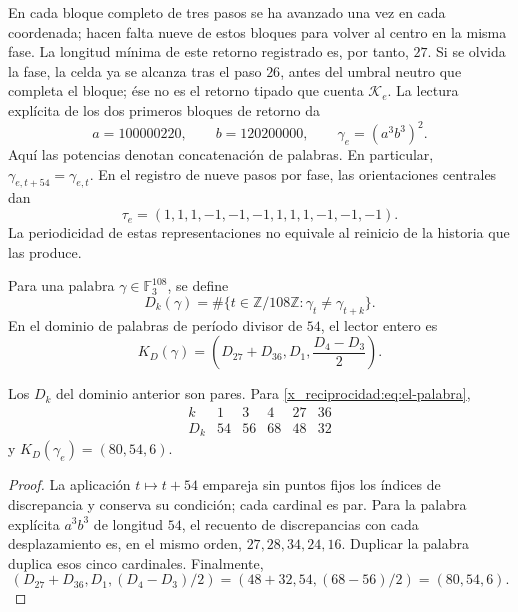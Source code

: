 En cada bloque completo de tres pasos se ha avanzado una vez en cada
coordenada; hacen falta nueve de estos bloques para volver al centro en
la misma fase. La longitud mínima de este retorno registrado es, por
tanto, \(27\). Si se olvida la fase, la celda ya se alcanza tras el
paso \(26\), antes del umbral neutro que completa el bloque; ése no es
el retorno tipado que cuenta \(\mathcal K_e\). La lectura explícita
de los dos primeros bloques de retorno da
\begin{equation}
 a=100000220,\qquad b=120200000,\qquad
 \gamma_e=(a^3b^3)^2.
 \label{x_reciprocidad:eq:el-palabra}
\end{equation}
Aquí las potencias denotan concatenación de palabras. En particular,
\(\gamma_{e,t+54}=\gamma_{e,t}\). En el registro de nueve pasos por
fase, las orientaciones centrales dan
\begin{equation}
 \tau_e=(1,1,1,-1,-1,-1,1,1,1,-1,-1,-1).
 \label{x_reciprocidad:eq:el-tau}
\end{equation}
La periodicidad de estas representaciones no equivale al reinicio de la
historia que las produce.

\begin{definition}
Para una palabra \(\gamma\in\mathbb F_3^{108}\), se define
\[
 D_k(\gamma)=\#\{t\in\mathbb Z/108\mathbb Z:
                   \gamma_t\ne\gamma_{t+k}\}.
\]
En el dominio de palabras de período divisor de \(54\), el lector
entero es
\begin{equation}
 K_D(\gamma)=\left(D_{27}+D_{36},D_1,\frac{D_4-D_3}{2}\right).
 \label{x_reciprocidad:eq:el-kd}
\end{equation}
\end{definition}

\begin{lemma}
Los \(D_k\) del dominio anterior son pares. Para
\eqref{x_reciprocidad:eq:el-palabra},
\[
 \begin{array}{c|rrrrr}
 k&1&3&4&27&36\\\hline
 D_k&54&56&68&48&32
 \end{array}
\]
y \(K_D(\gamma_e)=(80,54,6)\).
\end{lemma}
\begin{proof}
La aplicación \(t\mapsto t+54\) empareja sin puntos fijos los índices
de discrepancia y conserva su condición; cada cardinal es par. Para la
palabra explícita \(a^3b^3\) de longitud \(54\), el recuento de
discrepancias con cada desplazamiento es, en el mismo orden,
\(27,28,34,24,16\). Duplicar la palabra duplica esos cinco cardinales.
Finalmente,
\[
 (D_{27}+D_{36},D_1,(D_4-D_3)/2)
 =(48+32,54,(68-56)/2)=(80,54,6).
\]
\end{proof}

